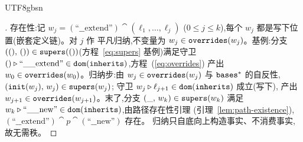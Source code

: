 \begin{CJK*}{UTF8}{gbsn}


\begin{proof}[]
\ifPaperChinese
  存在性:记 $w_j = (\text{``\_\_extend''}) \cat (\ell_1, \ldots, \ell_j)$
  ($0 \le j \le k$),每个 $w_j$ 都是写下位置(嵌套定义链)。对 $j$ 作
  平凡归纳,不变量为 $w_j \in \mathtt{overrides}(w_j)$。基例:分支
  $((),\, ()) \in \mathtt{supers}(())$(方程~\ref{eq:supers} 基例)满足守卫
  $() \mathbin{\triangleright} \text{``\_\_extend''} \in \mathtt{dom}(\mathtt{inherits})$,方程~(\ref{eq:overrides})
  产出 $w_0 \in \mathtt{overrides}(w_0)$。归纳步:由 $w_j \in \mathtt{overrides}(w_j)$
  与 $\mathtt{bases}^*$ 的自反性,$(\mathtt{init}(w_j),\, w_j) \in \mathtt{supers}(w_j)$;
  守卫 $w_j \mathbin{\triangleright} \ell_{j+1} \in \mathtt{dom}(\mathtt{inherits})$ 成立(写下),
  产出 $w_{j+1} \in \mathtt{overrides}(w_{j+1})$。末了,分支
  $(\_,\, w_k) \in \mathtt{supers}(w_k)$ 满足
  $w_k \mathbin{\triangleright} \text{``\_\_new''} \in \mathtt{dom}(\mathtt{inherits})$,由路径存在性引理
  (引理~\ref{lem:path-existence}),
  $(\text{``\_\_extend''}) \cat p \cat (\text{``\_\_new''})$ 存在。
  归纳只自底向上构造事实、不消费事实,故无需秩。


\end{proof}
\end{CJK*}
